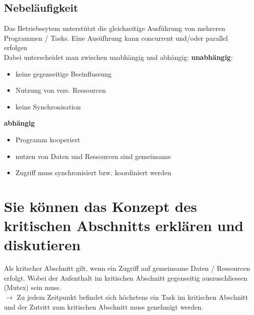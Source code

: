 \documentclass{report}
\theoremstyle{definition}
\theoremstyle{example}
\begin{document}
	\subsection{Nebeläufigkeit}
Das Betriebssytem unterstützt die gleichzeitige Ausführung von mehreren Programmen / Tasks. Eine Ausüfhrung kann concurrent und/oder parallel erfolgen\\
Dabei unterscheidet man zwischen unabhängig und abhängig:
\textbf{unabhängig}:
\begin{itemize}
	\item keine gegenseitige Beeinflussung
	\item Nutzung von vers. Ressourcen
	\item keine Synchronisation
\end{itemize}
\textbf{abhängig}
\begin{itemize}
	\item Programm kooperiert
	\item nutzen von Daten und Ressourcen sind gemeinsame
	\item Zugriff muss synchronisiert bzw. koordiniert werden
\end{itemize}


\section{Sie können das Konzept des kritischen Abschnitts erklären und diskutieren}
Als kritscher Abschnitt gilt, wenn ein Zugriff auf gemeinsame Daten / Ressourcen erfolgt. Wobei der Aufenthalt im kritischen Abschnitt gegenseitig auszuschliessen (Mutex) sein muss.\\
$\rightarrow$ Zu jedem Zeitpunkt befindet sich höchstens ein Task im kritischen Abschnitt und der Zutritt zum kritischen Abschnitt muss genehmigt werden.
\end{document}
